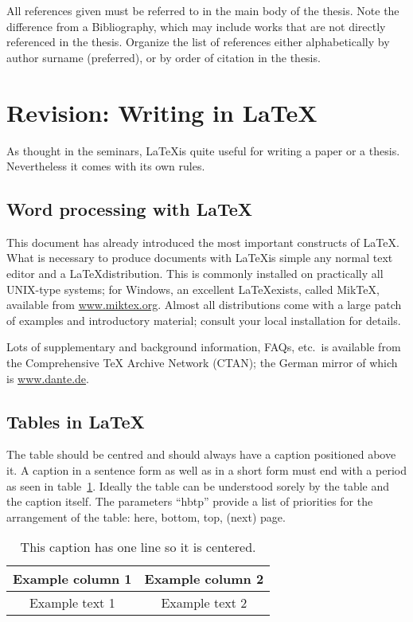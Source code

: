 All references given must be referred to in the main body of the thesis. Note the difference from a Bibliography, which may include works that are not directly referenced in the thesis. Organize the list of references either alphabetically by author surname (preferred), or by order of citation in the thesis. 



\section{Revision: Writing in \LaTeX}
As thought in the seminars, \LaTeX is quite useful for writing a paper or a thesis. Nevertheless it comes with its own rules.

\subsection{Word processing with \LaTeX}
\label{sec:model:subsec:latex}

This document has already introduced the most important constructs of
\LaTeX. What is necessary to produce documents with \LaTeX is simple
any normal text editor and a \LaTeX distribution. This is commonly
installed on practically all UNIX-type systems; for Windows, an
excellent \LaTeX exists, called MikTeX, available from
\url{www.miktex.org}. Almost all distributions come with a large patch
of examples and introductory material; consult your local installation
for details. 

Lots of supplementary and background information, FAQs, etc.\ is
available from the Comprehensive TeX Archive Network (CTAN); the
German mirror of which is \url{www.dante.de}. 

\subsection{Tables in \LaTeX}
\label{sec:model:subsec:tables}
The table should be centred and should always have a caption positioned above it. A caption in a sentence form as well as in a short form must end with a period as seen in table~\ref{tab:sample}. Ideally the table can be understood sorely by the table and the caption itself. The parameters ``hbtp'' provide a list of priorities for the arrangement of the table: here, bottom, top, (next) page.

\begin{table}[hbtp]
	\caption{This caption has one line so it is centered.}\label{tab:sample}
	\centering
	\begin{tabular}{|c|c|}
		\hline
		Example column 1 & Example column 2 \\
		\hline
		Example text 1   & Example text 2   \\
		\hline
	\end{tabular}
\end{table}

